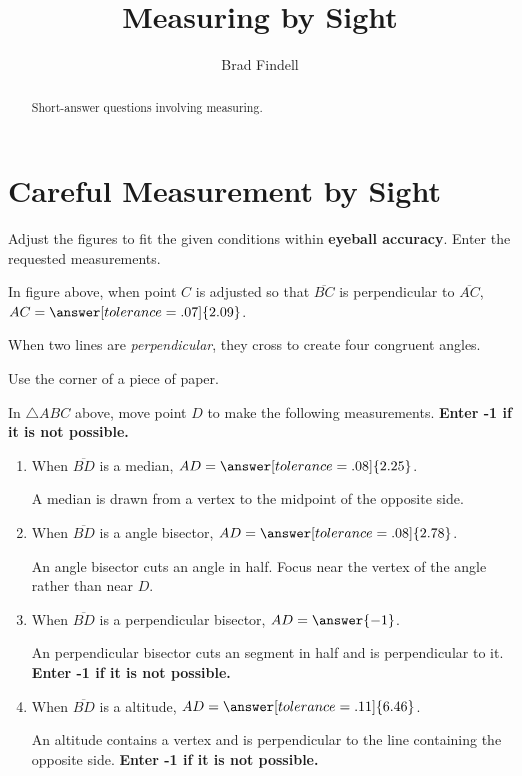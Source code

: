 \documentclass[nooutcomes]{ximera}
\title{Measuring by Sight}
\author{Brad Findell}
\begin{document}
\begin{abstract}
Short-answer questions involving measuring. 
\end{abstract}
\maketitle

\section{Careful Measurement by Sight}
Adjust the figures to fit the given conditions within \textbf{eyeball accuracy}.  Enter the requested measurements.  

\begin{problem}
\begin{center}  
\end{center}
In figure above, when point $C$ is adjusted so that $\overline{BC}$ is perpendicular to $\overline{AC}$, $AC=\answer[tolerance=.07]{2.09}$.
\begin{hint}
When two lines are \emph{perpendicular}, they cross to create four congruent angles. 
\end{hint}
\begin{hint}
Use the corner of a piece of paper.
\end{hint}
\end{problem}


\begin{problem}
\begin{center}  
\end{center}
In $\triangle ABC$ above, move point $D$ to make the following measurements.  \textbf{Enter -1 if it is not possible.}   
\begin{enumerate}
\item When $\overline{BD}$ is a median, $AD=\answer[tolerance=.08]{2.25}$.
\begin{hint}
A median is drawn from a vertex to the midpoint of the opposite side.
\end{hint}
\item When $\overline{BD}$ is a angle bisector, $AD=\answer[tolerance=.08]{2.78}$.
\begin{hint}
An angle bisector cuts an angle in half.  Focus near the vertex of the angle rather than near $D$.
\end{hint}
\item When $\overline{BD}$ is a perpendicular bisector, $AD=\answer{-1}$.
\begin{hint}
An perpendicular bisector cuts an segment in half and is perpendicular to it. \textbf{Enter -1 if it is not possible.} 
\end{hint}
\item When $\overline{BD}$ is a altitude, $AD=\answer[tolerance=.11]{6.46}$.
\begin{hint}
An altitude contains a vertex and is perpendicular to the line containing the opposite side. \textbf{Enter -1 if it is not possible.} 
\end{hint}
\end{enumerate}
\end{problem}
\end{document}
